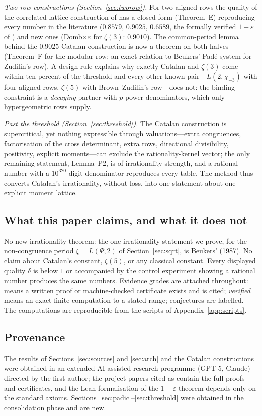 \emph{Two-row constructions (Section~\ref{sec:tworow}).} For two aligned rows the quality of the correlated-lattice construction of \cite{ProjCatalanLCM,ProjCatalan58} has a closed form (Theorem~E) reproducing every number in the literature ($0.8579$, $0.9025$, $0.6589$, the formally verified $1-\varepsilon$ of \cite{CatalanLean}) and new ones (Domb$\times\varepsilon$ for $\zeta(3)$: $0.9010$). The common-period lemma behind the $0.9025$ Catalan construction is now a theorem on both halves (Theorem~F for the modular row; an exact relation to Beukers' Pad\'e system for Zudilin's row). A design rule explains why exactly Catalan and $\zeta(3)$ come within ten percent of the threshold and every other known pair---$L(2,\chi_{-3})$ with four aligned rows, $\zeta(5)$ with Brown--Zudilin's row---does not: the binding constraint is a \emph{decaying} partner with $p$-power denominators, which only hypergeometric rows supply.

\emph{Past the threshold (Section~\ref{sec:threshold}).} The Catalan construction is supercritical, yet nothing expressible through valuations---extra congruences, factorisation of the cross determinant, extra rows, directional divisibility, positivity, explicit moments---can exclude the rationality-kernel vector; the only remaining statement, Lemma~P2, is of irrationality strength, and a rational number with a $10^{320}$-digit denominator reproduces every table. The method thus converts Catalan's irrationality, without loss, into one statement about one explicit moment lattice.

\subsection*{What this paper claims, and what it does not}
No new irrationality theorem: the one irrationality statement we prove, for the non-congruence period $\xi=L(\Psi,2)$ of Section~\ref{sec:sqrt}, is Beukers' (1987). No claim about Catalan's constant, $\zeta(5)$, or any classical constant. Every displayed quality $\delta$ is below $1$ or accompanied by the control experiment showing a rational number produces the same numbers. Evidence grades are attached throughout: \Proved{} means a written proof or machine-checked certificate exists and is cited; \emph{verified} means an exact finite computation to a stated range; conjectures are labelled. The computations are reproducible from the scripts of Appendix~\ref{app:scripts}.

\subsection*{Provenance}
The results of Sections~\ref{sec:sources} and \ref{sec:arch} and the Catalan constructions were obtained in an extended AI-assisted research programme (GPT-5, Claude) directed by the first author; the project papers cited as \cite{ProjSources,ProjAnchors,ProjCatalanLCM,ProjCatalan58,LeanCatalan} contain the full proofs and certificates, and the Lean formalisation \cite{CatalanLean} of the $1-\varepsilon$ theorem depends only on the standard axioms. Sections~\ref{sec:padic}--\ref{sec:threshold} were obtained in the consolidation phase and are new.
